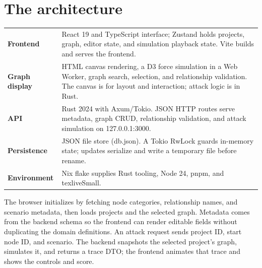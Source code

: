 \documentclass[11pt,oneside]{book}
\begin{document}
\section{The architecture}
\begin{center}\begin{tabularx}{\textwidth}{>{\bfseries}p{} X}
Frontend & React 19 and TypeScript interface; Zustand holds projects, graph, editor state, and simulation playback state. Vite builds and serves the frontend.\\
Graph display & HTML canvas rendering, a D3 force simulation in a Web Worker, graph search, selection, and relationship validation. The canvas is for layout and interaction; attack logic is in Rust.\\
API & Rust 2024 with Axum/Tokio. JSON HTTP routes serve metadata, graph CRUD, relationship validation, and attack simulation on 127.0.0.1:3000.\\
Persistence & JSON file store (db.json). A Tokio RwLock guards in-memory state; updates serialize and write a temporary file before rename.\\
Environment & Nix flake supplies Rust tooling, Node 24, pnpm, and texliveSmall.\\
\end{tabularx}\end{center}

The browser initializes by fetching node categories, relationship names, and scenario metadata, then loads projects and the selected graph. Metadata comes from the backend schema so the frontend can render editable fields without duplicating the domain definitions. An attack request sends project ID, start node ID, and scenario. The backend snapshots the selected project's graph, simulates it, and returns a trace DTO; the frontend animates that trace and shows the controls and score.
\end{document}
